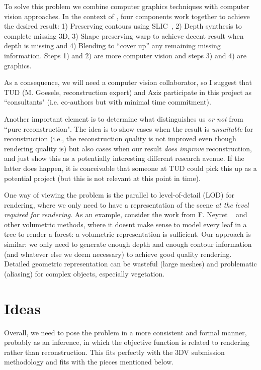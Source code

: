 \documentclass{article}
\begin{document}
To solve this problem we combine computer graphics techniques with computer vision approaches.
In the context of \cite{chaurasia13}, four components work together to achieve the desired result:
1) Preserving contours using SLIC~\cite{slic12}, 2) Depth synthesis to complete missing 3D,
3) Shape preserving warp to achieve decent result when depth is missing and 4) Blending to
``cover up'' any remaining missing information. Steps 1) and 2) are more computer vision and
steps 3) and 4) are graphics.

As a consequence, we will need a computer vision collaborator, so I suggest that TUD (M. Goesele,
reconstruction expert) and Aziz participate in this project as ``consultants" (i.e. co-authors
but with minimal time commitment).

Another important element is to determine what distinguishes us \emph{or not} from ``pure reconstruction". The idea is to show cases when the result is \emph{unsuitable} for reconstruction (i.e., the reconstruction quality is not improved even though rendering quality is) but also cases when our result \emph{does improve} reconstruction, and just show this as a potentially interesting different research avenue.
If the latter does happen, it is conceivable that someone at TUD could pick this up as 
a potential project (but this is not relevant at this point in time).

One way of viewing the problem is the parallel to level-of-detail (LOD) for rendering, where
we only need to have a representation of the scene \emph{at the level required for rendering}.
As an example, consider the work from F. Neyret ~\cite{bruneton2012real,crassin2009gigavoxels} and other volumetric methods,
where it doesnt make sense to model every leaf in a tree to render a forest: a volumetric representation
is sufficient. 
Our approach is similar: we only need to generate enough depth and enough contour information (and
whatever else we deem necessary) to achieve good quality rendering. Detailed geometric representation
can be wasteful (large meshes) and problematic (aliasing) for complex objects, especially vegetation.

\section{Ideas}
\label{sec:depthideas}

Overall, we need to pose the problem in a more consistent and formal manner, probably as an
inference, in which the objective function is related to rendering rather than reconstruction.
This fits perfectly with the 3DV submission methodology and fits with the pieces mentioned
below.
\end{document}
